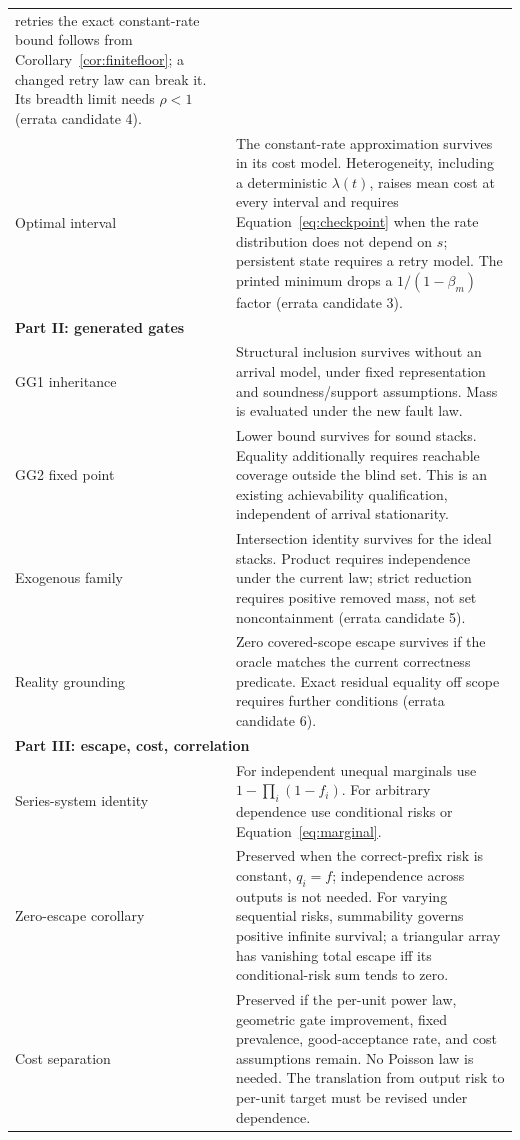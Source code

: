 \documentclass[11pt]{article}
\theoremstyle{definition}
\theoremstyle{remark}
\begin{document}
\begin{longtable}{p{}p{}}
retries the exact constant-rate bound follows from Corollary~\ref{cor:finitefloor}; a changed
retry law can break it. Its breadth limit needs $\rho<1$ (errata candidate 4).\\
Optimal interval & The constant-rate approximation survives in its cost model. Heterogeneity,
including a deterministic $\lambda(t)$, raises mean cost at every interval and requires
Equation~\eqref{eq:checkpoint} when the rate distribution does not depend on $s$; persistent state
requires a retry model. The printed minimum drops a $1/(1-\beta_m)$ factor (errata candidate 3).\\
\midrule
\multicolumn{2}{l}{\textbf{Part II: generated gates}}\\
GG1 inheritance & Structural inclusion survives without an arrival model, under fixed
representation and soundness/support assumptions. Mass is evaluated under the new fault law.\\
GG2 fixed point & Lower bound survives for sound stacks. Equality additionally requires
reachable coverage outside the blind set. This is an existing achievability qualification,
independent of arrival stationarity.\\
Exogenous family & Intersection identity survives for the ideal stacks. Product requires
independence under the current law; strict reduction requires positive removed mass, not
set noncontainment (errata candidate 5).\\
Reality grounding & Zero covered-scope escape survives if the oracle matches the current
correctness predicate. Exact residual equality off scope requires further conditions
(errata candidate 6).\\
\midrule
\multicolumn{2}{l}{\textbf{Part III: escape, cost, correlation}}\\
Series-system identity & For independent unequal marginals use $1-\prod_i(1-f_i)$.
For arbitrary dependence use conditional risks or Equation~\eqref{eq:marginal}.\\
Zero-escape corollary & Preserved when the correct-prefix risk is constant, $q_i=f$;
independence across outputs is not needed. For varying sequential risks,
summability governs positive infinite survival; a triangular array has vanishing total escape
iff its conditional-risk sum tends to zero.\\
Cost separation & Preserved if the per-unit power law, geometric gate improvement, fixed
prevalence, good-acceptance rate, and cost assumptions remain. No Poisson law is needed.
The translation from output risk to per-unit target must be revised under dependence.\\

\end{longtable}
\end{document}
